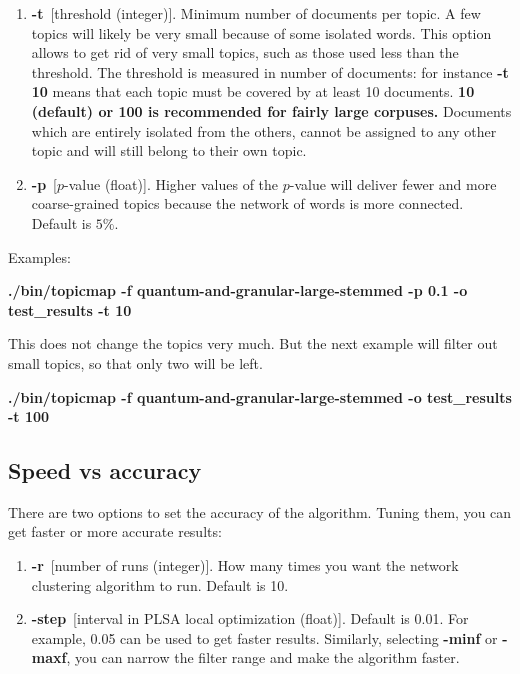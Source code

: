 \documentclass[11pt]{article}
\begin{document}
\begin{enumerate}
\item \textbf{-t}~[threshold (integer)]. Minimum number of documents per topic. A few topics will likely be very small because of some isolated words. This option allows to get rid of very small topics, such as those used less than the threshold. The threshold is measured in number of documents: for instance \textbf{-t 10} means that each topic must be covered by  at least 10 documents. \textbf{10 (default) or 100 is recommended for fairly large corpuses.} \small{Documents which are entirely isolated from the others, cannot be assigned to any other topic and will still belong to their own topic.}\normalsize{}

\item \textbf{-p}~[$p$-value (float)].
Higher values of the $p$-value will deliver fewer and  more coarse-grained topics because the network of words is more connected. Default is $5\%$.
\end{enumerate}

Examples:

\textbf{./bin/topicmap -f quantum-and-granular-large-stemmed -p 0.1 -o test\_results -t 10}

This does not change the topics very much. But the next example will filter out small topics, so that only two will be left.


\textbf{./bin/topicmap -f quantum-and-granular-large-stemmed -o test\_results -t 100}




\subsection{Speed vs accuracy}

There are two options to set the accuracy of the algorithm. Tuning them, you can get faster or more accurate results:


\begin{enumerate}

\item \textbf{-r}~[number of runs (integer)].
How many times you want the network clustering algorithm to run. Default is 10.

\item \textbf{-step}~[interval in PLSA local optimization (float)].
Default is 0.01. For example, 0.05 can be used to get faster results.
Similarly, selecting \textbf{-minf} or \textbf{-maxf}, you can narrow the filter range and make the algorithm faster.
\end{enumerate}
\end{document}
